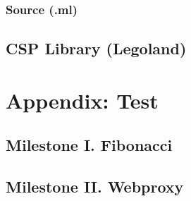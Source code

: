 \documentclass[a4paper,12pt]{article}
\begin{document}
\subsubsection{Source (.ml)}

\subsection{CSP Library (Legoland)}

\normalsize

\newpage
\section{Appendix: Test}
\scriptsize
\subsection{Milestone I. Fibonacci}


\subsection{Milestone II. Webproxy}

\normalsize
\end{document}
